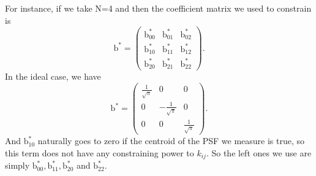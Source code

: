 \documentclass[apj]{emulateapj}
\begin{document}
For instance, if we take N=4 and then the coefficient matrix we used to constrain is
\begin{equation}
\mathrm{b}^{*}=\begin{pmatrix} \mathrm{b}^{*}_{00}  & \mathrm{b}^{*}_{01}  &
\mathrm{b}^{*}_{02} \\ \mathrm{b}^{*}_{10}  & \mathrm{b}^{*}_{11}  & \mathrm{b}^{*}_{12} \\
\mathrm{b}^{*}_{20} & \mathrm{b}^{*}_{21}  & \mathrm{b}^{*}_{22} \end{pmatrix}.
\end{equation}
In the ideal case, we have
\begin{equation}
\mathrm{b}^{*}=\begin{pmatrix} \frac{1}{\sqrt{\pi}}  & 0  &
0 \\ 0  & -\frac{1}{\sqrt{\pi}}  & 0 \\
0 & 0  & \frac{1}{\sqrt{\pi}} \end{pmatrix}.
\end{equation}
And $\mathrm{b}^{*}_{10}$ naturally goes to zero if the centroid of the PSF we measure
is true, so this term does not have any constraining power to $k_{ij}$. So the left ones
we use are simply $\mathrm{b}^{*}_{00}, \mathrm{b}^{*}_{11}, \mathrm{b}^{*}_{20}$ and 
$\mathrm{b}^{*}_{22}$. 
\end{document}
